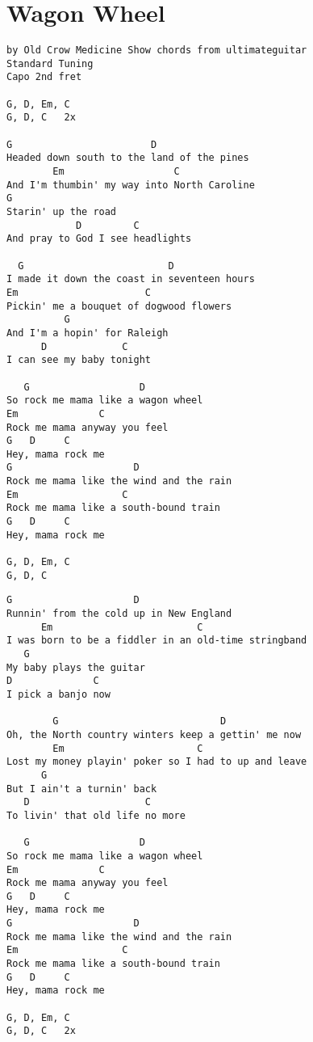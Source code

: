 \documentclass[leqno]{memoir}
\begin{document}
\chapter{Wagon Wheel}
\begin{verbatim}
by Old Crow Medicine Show chords from ultimateguitar
Standard Tuning
Capo 2nd fret

G, D, Em, C
G, D, C   2x

G                        D
Headed down south to the land of the pines
        Em                   C
And I'm thumbin' my way into North Caroline
G
Starin' up the road
            D         C
And pray to God I see headlights

  G                         D
I made it down the coast in seventeen hours
Em                      C
Pickin' me a bouquet of dogwood flowers
          G
And I'm a hopin' for Raleigh
      D             C
I can see my baby tonight

   G                   D
So rock me mama like a wagon wheel
Em              C
Rock me mama anyway you feel
G   D     C
Hey, mama rock me
G                     D
Rock me mama like the wind and the rain
Em                  C
Rock me mama like a south-bound train
G   D     C
Hey, mama rock me

G, D, Em, C
G, D, C
\end{verbatim}
\newpage
\begin{verbatim}
G                     D
Runnin' from the cold up in New England
      Em                         C
I was born to be a fiddler in an old-time stringband
   G
My baby plays the guitar
D              C
I pick a banjo now

        G                            D
Oh, the North country winters keep a gettin' me now
        Em                       C
Lost my money playin' poker so I had to up and leave
      G
But I ain't a turnin' back
   D                    C
To livin' that old life no more

   G                   D
So rock me mama like a wagon wheel
Em              C
Rock me mama anyway you feel
G   D     C
Hey, mama rock me
G                     D
Rock me mama like the wind and the rain
Em                  C
Rock me mama like a south-bound train
G   D     C
Hey, mama rock me

G, D, Em, C
G, D, C   2x
\end{verbatim}
\newpage
\end{document}
